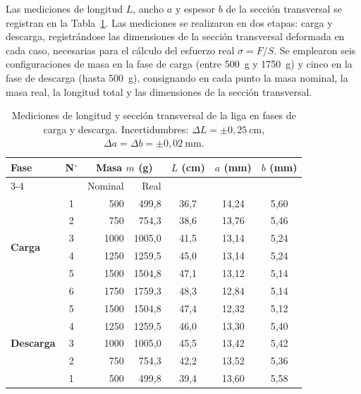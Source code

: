 Las mediciones de longitud $L$, ancho $a$ y espesor $b$ de la sección
transversal se registran en la Tabla~\ref{tab:datos_liga}. Las mediciones
se realizaron en dos etapas: carga y descarga, registrándose las
dimensiones de la sección transversal deformada en cada caso, necesarias
para el cálculo del esfuerzo real $\sigma = F/S$. Se emplearon seis
configuraciones de masa en la fase de carga (entre \qty{500}{g} y
\qty{1750}{g}) y cinco en la fase de descarga (hasta \qty{500}{g}),
consignando en cada punto la masa nominal, la masa real, la longitud
total y las dimensiones de la sección transversal.

\begin{table}[H]
    \centering
    \caption{Mediciones de longitud y sección transversal de la liga en
             fases de carga y descarga.
             Incertidumbres: $\Delta L = \pm 0{,}25\ \text{cm}$,\;
             $\Delta a = \Delta b = \pm 0{,}02\ \text{mm}$.}
    \label{tab:datos_liga}
    \begin{tabular}{lcrrccc}
        \toprule
        \multirow{2}{*}{\textbf{Fase}}
            & \multirow{2}{*}{\textbf{N$^{\circ}$}}
            & \multicolumn{2}{c}{\textbf{Masa $m$ (g)}}
            & \textbf{$L$ (cm)}
            & \textbf{$a$ (mm)}
            & \textbf{$b$ (mm)} \\
        \cmidrule(lr){3-4}
            & & Nominal & Real & & & \\
        \midrule
        \multirow{6}{*}{\textbf{Carga}}
            & 1 &  500 &  499{,}8 & 36{,}7 & 14{,}24 & 5{,}60 \\
            & 2 &  750 &  754{,}3 & 38{,}6 & 13{,}76 & 5{,}46 \\
            & 3 & 1000 & 1005{,}0 & 41{,}5 & 13{,}14 & 5{,}24 \\
            & 4 & 1250 & 1259{,}5 & 45{,}0 & 13{,}14 & 5{,}24 \\
            & 5 & 1500 & 1504{,}8 & 47{,}1 & 13{,}12 & 5{,}14 \\
            & 6 & 1750 & 1759{,}3 & 48{,}3 & 12{,}84 & 5{,}14 \\
        \midrule
        \multirow{5}{*}{\textbf{Descarga}}
            & 5 & 1500 & 1504{,}8 & 47{,}4 & 12{,}32 & 5{,}12 \\
            & 4 & 1250 & 1259{,}5 & 46{,}0 & 13{,}30 & 5{,}40 \\
            & 3 & 1000 & 1005{,}0 & 45{,}5 & 13{,}42 & 5{,}42 \\
            & 2 &  750 &  754{,}3 & 42{,}2 & 13{,}52 & 5{,}36 \\
            & 1 &  500 &  499{,}8 & 39{,}4 & 13{,}60 & 5{,}58 \\
        \bottomrule
    \end{tabular}
\end{table}
